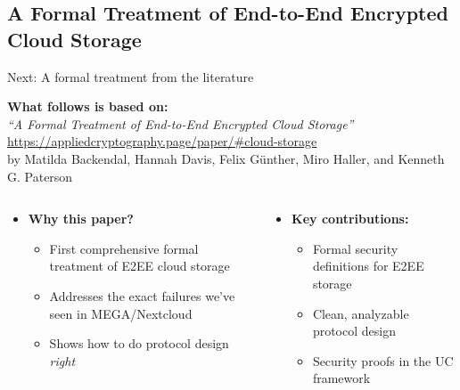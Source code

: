 \documentclass[aspectratio=169, lualatex, handout]{beamer}
\begin{document}
\subsection{A Formal Treatment of End-to-End Encrypted Cloud Storage}

\begin{frame}{Next: A formal treatment from the literature}
	\begin{center}
		\textbf{What follows is based on:}\\
		\vspace{0.3cm}
		\textit{``A Formal Treatment of End-to-End Encrypted Cloud Storage''}\\
		{\tiny\url{https://appliedcryptography.page/paper/\#cloud-storage}}\\
		\vspace{0.2cm}
		{\small by Matilda Backendal, Hannah Davis, Felix Günther, Miro Haller, and Kenneth G. Paterson}
	\end{center}
	\begin{columns}[t]
		\begin{column}{0.5\textwidth}
			\begin{itemize}
				\item \textbf{Why this paper?}
				      \begin{itemize}
					      \item First comprehensive formal treatment of E2EE cloud storage
					      \item Addresses the exact failures we've seen in MEGA/Nextcloud
					      \item Shows how to do protocol design \textit{right}
				      \end{itemize}
			\end{itemize}
		\end{column}
		\begin{column}{0.5\textwidth}
			\begin{itemize}
				\item \textbf{Key contributions:}
				      \begin{itemize}
					      \item Formal security definitions for E2EE storage
					      \item Clean, analyzable protocol design
					      \item Security proofs in the UC framework
				      \end{itemize}
			\end{itemize}
		\end{column}
	\end{columns}
\end{frame}
\end{document}

